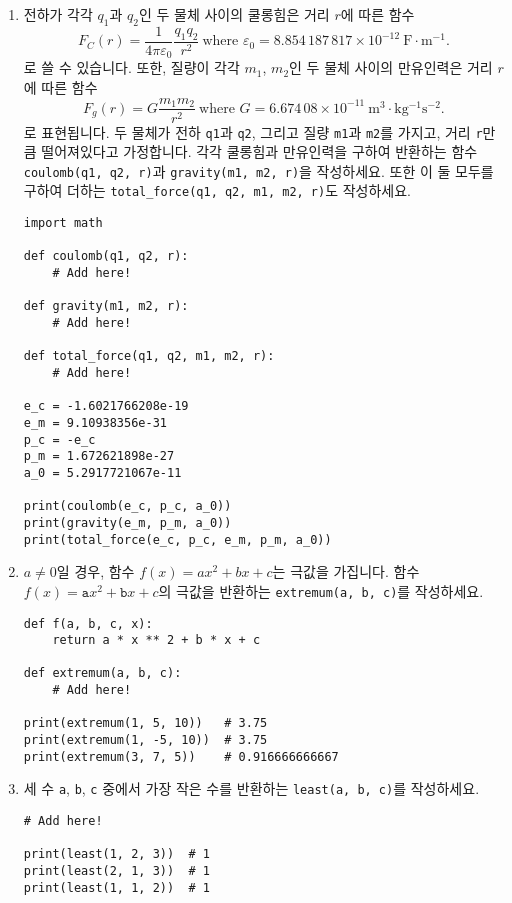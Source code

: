\documentclass[../main.tex]{subfiles}
\begin{document}
\begin{enumerate}
\item 전하가 각각 $q_1$과 $q_2$인 두 물체 사이의 쿨롱힘은 거리 $r$에 따른 함수
\[
  F_C(r) = \frac{1}{4\pi \varepsilon_0} \frac{q_1 q_2}{r^2}\ \text{where $\varepsilon_0 = 8.854\,187\,817 \times 10^{-12}\ \mathrm{F \cdot m^{-1}}$}.
\]
로 쓸 수 있습니다.
또한, 질량이 각각 $m_1$, $m_2$인 두 물체 사이의 만유인력은 거리 $r$에 따른 함수
\[
  F_g(r) = G \frac{m_1 m_2}{r^2}\ \text{where $G = 6.674\,08 \times 10^{-11}\ \mathrm{m^3 \cdot kg^{-1} s^{-2}}$}.
\]
로 표현됩니다.
두 물체가 전하 \texttt{q1}과 \texttt{q2}, 그리고 질량 \texttt{m1}과
\texttt{m2}를 가지고, 거리 \texttt{r}만큼 떨어져있다고 가정합니다.
각각 쿨롱힘과 만유인력을 구하여 반환하는 함수 \verb|coulomb(q1, q2, r)|과
\verb|gravity(m1, m2, r)|을 작성하세요.
또한 이 둘 모두를 구하여 더하는 \verb/total_force(q1, q2, m1, m2, r)/도
작성하세요.
\begin{verbatim}
import math

def coulomb(q1, q2, r):
    # Add here!

def gravity(m1, m2, r):
    # Add here!

def total_force(q1, q2, m1, m2, r):
    # Add here!

e_c = -1.6021766208e-19
e_m = 9.10938356e-31
p_c = -e_c
p_m = 1.672621898e-27
a_0 = 5.2917721067e-11

print(coulomb(e_c, p_c, a_0))
print(gravity(e_m, p_m, a_0))
print(total_force(e_c, p_c, e_m, p_m, a_0))
\end{verbatim}

\item  $a \neq 0$일 경우, 함수 $f(x) = ax^2 + bx + c$는 극값을 가집니다.
함수 $f(x) = \texttt{a}x^2 + \texttt{b}x + c$의 극값을 반환하는
\verb/extremum(a, b, c)/를 작성하세요.
\begin{verbatim}
def f(a, b, c, x):
    return a * x ** 2 + b * x + c

def extremum(a, b, c):
    # Add here!

print(extremum(1, 5, 10))   # 3.75
print(extremum(1, -5, 10))  # 3.75
print(extremum(3, 7, 5))    # 0.916666666667
\end{verbatim}

\item 세 수 \verb|a|, \verb|b|, \verb|c| 중에서 가장 작은 수를 반환하는
  \verb/least(a, b, c)/를 작성하세요.
\begin{verbatim}
# Add here!

print(least(1, 2, 3))  # 1
print(least(2, 1, 3))  # 1
print(least(1, 1, 2))  # 1
\end{verbatim}


\end{enumerate}
\end{document}
